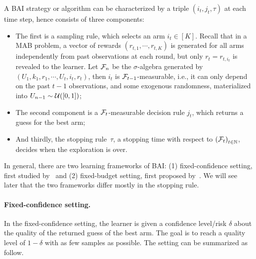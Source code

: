 A BAI strategy or algorithm can be characterized by a triple $(i_t, j_t, \tau)$ at each time step, hence consists of three components: 
\begin{itemize}
    \item The first is a \gls{sampling rule}, which selects an arm $i_t\in[K]$. Recall that in a MAB problem, a vector of rewards $(r_{t,1},\cdots,r_{t,K})$ is generated for all arms independently from past observations at each round, but only $r_t = r_{t,i_t}$ is revealed to the learner. Let $\mathcal{F}_n$ be the $\sigma$-algebra generated by $(U_1,k_1,r_1,\cdots,U_t,i_t,r_t)$, then $i_t$ is $\mathcal{F}_{t-1}$-measurable, i.e., it can only depend on the past $t-1$ observations, and some exogenous randomness, materialized into $U_{n-1} \sim \mathcal{U}([0,1])$;
    \item The second component is a $\mathcal{F}_{t}$-measurable \gls{decision rule} $j_t$, which returns a guess for the best arm;
    \item And thirdly, the \gls{stopping rule}~$\tau$, a stopping time with respect to $\left(\mathcal{F}_{t}\right)_{t \in \mathbb{N}}$, decides when the exploration is over.
\end{itemize}

In general, there are two learning frameworks of BAI: (1) \gls{fixed-confidence setting}, first studied by~\citep{even-dar2003confidence} and (2) \gls{fixed-budget setting}, first proposed by~\citep{audibert2010budget}. We will see later that the two frameworks differ mostly in the stopping rule.

\paragraph{Fixed-confidence setting.}

In the fixed-confidence setting, the learner is given a confidence level/risk $\delta$ about the quality of the returned guess of the best arm. The goal is to reach a quality level of $1-\delta$ with as few samples as possible. The setting can be summarized as follow.

